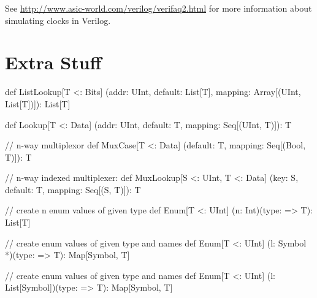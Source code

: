 \documentclass[10pt,twocolumn]{article}
\begin{document}
\noindent
See \url{http://www.asic-world.com/verilog/verifaq2.html} for more information about simulating clocks in Verilog.


\section{Extra Stuff}

\lstset{language=scala}

\begin{scala}
def ListLookup[T <: Bits]
  (addr: UInt, default: List[T], 
   mapping: Array[(UInt, List[T])]): List[T]

def Lookup[T <: Data]
  (addr: UInt, default: T, 
   mapping: Seq[(UInt, T)]): T

// n-way multiplexor
def MuxCase[T <: Data] 
  (default: T, mapping: Seq[(Bool, T)]): T

// n-way indexed multiplexer:
def MuxLookup[S <: UInt, T <: Data] 
  (key: S, default: T, mapping: Seq[(S, T)]): T
\end{scala}


\begin{scala}
// create n enum values of given type
def Enum[T <: UInt]
  (n: Int)(type: => T): List[T]

// create enum values of given type and names
def Enum[T <: UInt]
  (l: Symbol *)(type: => T): Map[Symbol, T]

// create enum values of given type and names
def Enum[T <: UInt]
  (l: List[Symbol])(type: => T): Map[Symbol, T]
\end{scala}

% 
\end{document}
